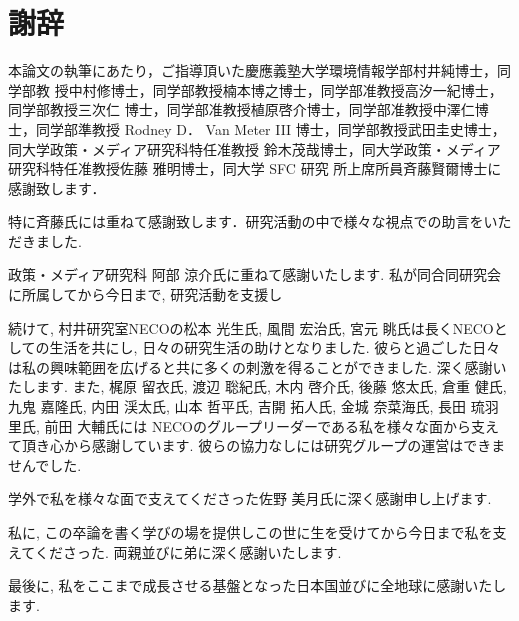 \chapter*{謝辞}
\label{thanks}

本論文の執筆にあたり，ご指導頂いた慶應義塾大学環境情報学部村井純博士，同学部教
授中村修博士，同学部教授楠本博之博士，同学部准教授高汐一紀博士，同学部教授三次仁
博士，同学部准教授植原啓介博士，同学部准教授中澤仁博士，同学部準教授 Rodney D．
Van Meter III 博士，同学部教授武田圭史博士，同大学政策・メディア研究科特任准教授
鈴木茂哉博士，同大学政策・メディア研究科特任准教授佐藤 雅明博士，同大学 SFC 研究
所上席所員斉藤賢爾博士に感謝致します．

特に斉藤氏には重ねて感謝致します．研究活動の中で様々な視点での助言をいただきました. 

政策・メディア研究科 阿部 涼介氏に重ねて感謝いたします. 私が同合同研究会に所属してから今日まで, 研究活動を支援し

続けて, 村井研究室NECOの松本 光生氏, 風間 宏治氏, 宮元 眺氏は長くNECOとしての生活を共にし,
日々の研究生活の助けとなりました. 彼らと過ごした日々は私の興味範囲を広げると共に多くの刺激を得ることができました. 深く感謝いたします.
また, 梶原 留衣氏, 渡辺 聡紀氏, 木内 啓介氏, 後藤 悠太氏, 倉重 健氏, 九鬼 嘉隆氏,
内田 渓太氏, 山本 哲平氏, 吉開 拓人氏, 金城 奈菜海氏, 長田 琉羽里氏, 前田 大輔氏には
NECOのグループリーダーである私を様々な面から支えて頂き心から感謝しています. 彼らの協力なしには研究グループの運営はできませんでした.

学外で私を様々な面で支えてくださった佐野 美月氏に深く感謝申し上げます.

私に, この卒論を書く学びの場を提供しこの世に生を受けてから今日まで私を支えてくださった. 両親並びに弟に深く感謝いたします.

最後に, 私をここまで成長させる基盤となった日本国並びに全地球に感謝いたします.


